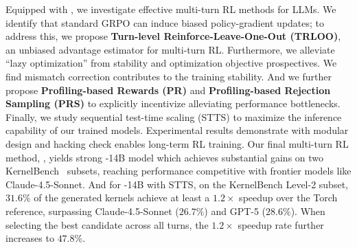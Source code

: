 Equipped with \env{}, we investigate effective multi-turn RL methods for LLMs. We identify that standard GRPO can induce biased policy-gradient updates; to address this, we propose \textbf{Turn-level Reinforce-Leave-One-Out (TRLOO)}, an unbiased advantage estimator for multi-turn RL. Furthermore, we alleviate ``lazy optimization'' from stability and optimization objective prospectives. We find mismatch correction contributes to the training stability. And we further propose \textbf{Profiling-based Rewards (PR)} and \textbf{Profiling-based Rejection Sampling (PRS)} to explicitly incentivize alleviating performance bottlenecks. Finally, we study sequential test-time scaling (STTS) to maximize the inference capability of our trained models. Experimental results demonstrate \env{} with modular design and hacking check enables long-term RL training. Our final multi-turn RL method, , yields strong -14B model which achieves substantial gains on two KernelBench~\citep{ouyang2025kernelbench} subsets, reaching performance competitive with frontier models like Claude-4.5-Sonnet. And for -14B with STTS, on the KernelBench Level-2 subset, $31.6\%$ of the generated kernels achieve at least a $1.2\times$ speedup over the Torch reference, surpassing Claude-4.5-Sonnet ($26.7\%$) and GPT-5 ($28.6\%$). When selecting the best candidate across all turns, the $1.2\times$ speedup rate further increases to $47.8\%$.